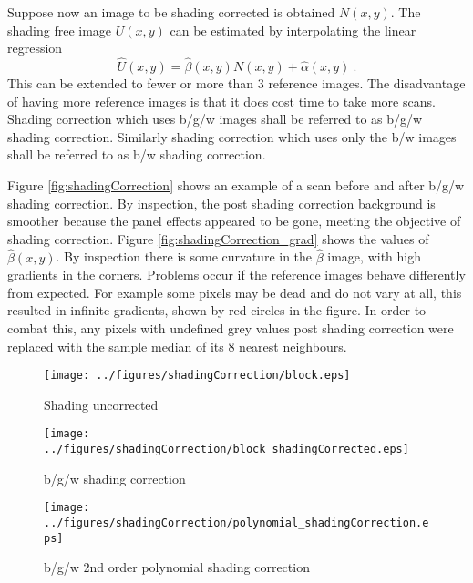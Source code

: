 \documentclass[a4paper]{proc}
\begin{document}
Suppose now an image to be shading corrected is obtained $N(x,y)$. The shading free image $U(x,y)$ can be estimated by interpolating the linear regression
\begin{equation}
\widehat{U}(x,y) = \widehat{\beta}(x,y)N(x,y)+\widehat{\alpha}(x,y) \ .
\end{equation}
This can be extended to fewer or more than 3 reference images. The disadvantage of having more reference images is that it does cost time to take more scans. Shading correction which uses b/g/w images shall be referred to as b/g/w shading correction. Similarly shading correction which uses only the b/w images shall be referred to as b/w shading correction.

Figure \ref{fig:shadingCorrection} shows an example of a scan before and after b/g/w shading correction. By inspection, the post shading correction background is smoother because the panel effects appeared to be gone, meeting the objective of shading correction. Figure \ref{fig:shadingCorrection_grad} shows the values of $\widehat{\beta}(x,y)$. By inspection there is some curvature in the $\widehat{\beta}$ image, with high gradients in the corners. Problems occur if the reference images behave differently from expected. For example some pixels may be dead and do not vary at all, this resulted in infinite gradients, shown by red circles in the figure. In order to combat this, any pixels with undefined grey values post shading correction were replaced with the sample median of its 8 nearest neighbours.

\begin{figure*}
	\centering
	\begin{subfigure}{0.45\textwidth}
		\centering
		\texttt{[image: ../figures/shadingCorrection/block.eps]}
		\caption{Shading uncorrected}
	\end{subfigure}
	\begin{subfigure}{0.45\textwidth}
		\centering
		\texttt{[image: ../figures/shadingCorrection/block\_shadingCorrected.eps]}
		\caption{b/g/w shading correction}
	\end{subfigure}
	\begin{subfigure}{0.45\textwidth}
		\texttt{[image: ../figures/shadingCorrection/polynomial\_shadingCorrection.eps]}
		\caption{b/g/w 2nd order polynomial shading correction}
	\end{subfigure}
	\caption{A x-ray CT scan image before and after b/g/w shading correction.}
	\label{fig:shadingCorrection}
\end{figure*}
\end{document}
